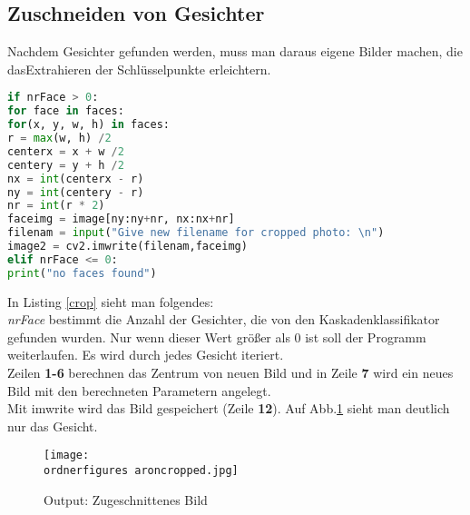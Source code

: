 \begin{flushleft}
	
\subsection{Zuschneiden von Gesichter}

Nachdem Gesichter gefunden werden, muss man daraus eigene Bilder machen, die dasExtrahieren der Schlüsselpunkte erleichtern.\\  

\begin{lstlisting}[language=python,caption=Code Abschnitt: Gesicht
Zuschneiden,label=crop]
if nrFace > 0:
for face in faces:
for(x, y, w, h) in faces:
r = max(w, h) /2 
centerx = x + w /2 
centery = y + h /2
nx = int(centerx - r) 
ny = int(centery - r) 
nr = int(r * 2) 
faceimg = image[ny:ny+nr, nx:nx+nr] 
filenam = input("Give new filename for cropped photo: \n")
image2 = cv2.imwrite(filenam,faceimg)
elif nrFace <= 0:
print("no faces found")

\end{lstlisting}

In Listing \ref{crop} sieht man folgendes:\\

\textit{nrFace} bestimmt die Anzahl der Gesichter, die von den
Kaskadenklassifikator gefunden wurden. 
Nur wenn dieser Wert größer als 0 ist soll der Programm weiterlaufen.  
Es wird durch jedes Gesicht iteriert.
\\

Zeilen \textbf{1-6} berechnen das Zentrum von neuen Bild und in Zeile \textbf{7}
wird ein neues Bild mit den berechneten Parametern angelegt.\\
Mit imwrite wird das Bild gespeichert (Zeile \textbf{12}). 
Auf Abb.\ref{fig:aroncropped} sieht man deutlich nur das Gesicht.
\\

\begin{figure}[H]
	\centering
	\texttt{[image: \\ordnerfigures aroncropped.jpg]}
	\caption{Output: Zugeschnittenes Bild}
	\label{fig:aroncropped}
\end{figure}
\end{flushleft}

